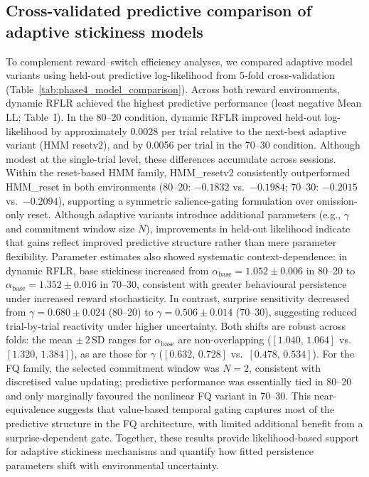 \documentclass[11pt, reprint, aps, prl]{revtex4-2}
\begin{document}
\subsection{Cross-validated predictive comparison of adaptive stickiness models}
To complement reward--switch efficiency analyses, we compared adaptive model variants using held-out predictive
log-likelihood from 5-fold cross-validation (Table~\ref{tab:phase4_model_comparison}).
Across both reward environments, dynamic RFLR achieved the highest predictive performance (least negative Mean LL; Table~I). In the 80--20 condition, dynamic RFLR improved held-out log-likelihood by approximately 0.0028 per trial relative to the next-best adaptive variant (HMM resetv2), and by 0.0056 per trial in the 70--30 condition. Although modest at the single-trial level, these differences accumulate across sessions. Within the reset-based HMM family, HMM\_resetv2 consistently outperformed HMM\_reset in both environments (80--20: $-0.1832$ vs.\ $-0.1984$; 70--30: $-0.2015$ vs.\ $-0.2094$), supporting a symmetric salience-gating formulation over omission-only reset. Although adaptive variants introduce additional parameters (e.g., $\gamma$ and commitment window size $N$), improvements in held-out likelihood indicate that gains reflect improved predictive structure rather than mere parameter flexibility. Parameter estimates also showed systematic
context-dependence: in dynamic RFLR, base stickiness increased from $\alpha_{\text{base}}=1.052\pm0.006$ in 80--20
to $\alpha_{\text{base}}=1.352\pm0.016$ in 70--30, consistent with greater behavioural persistence under increased
reward stochasticity. In contrast, surprise sensitivity decreased from $\gamma=0.680\pm0.024$ (80--20) to
$\gamma=0.506\pm0.014$ (70--30), suggesting reduced trial-by-trial reactivity under higher uncertainty.
Both shifts are robust across folds: the mean $\pm\,2\,$SD ranges for $\alpha_{\text{base}}$ are non-overlapping ($[1.040,\,1.064]$ vs.\ $[1.320,\,1.384]$), as are those for $\gamma$ ($[0.632,\,0.728]$ vs.\ $[0.478,\,0.534]$).
For the FQ family, the selected commitment window was $N=2$, consistent with discretised value updating; predictive performance was essentially tied in 80--20 and only marginally favoured the nonlinear FQ variant in 70--30. This near-equivalence suggests that value-based temporal gating captures most of the predictive structure in the FQ architecture, with limited additional benefit from a surprise-dependent gate.
Together, these results provide likelihood-based support for adaptive stickiness mechanisms and quantify how fitted
persistence parameters shift with environmental uncertainty.
\end{document}
